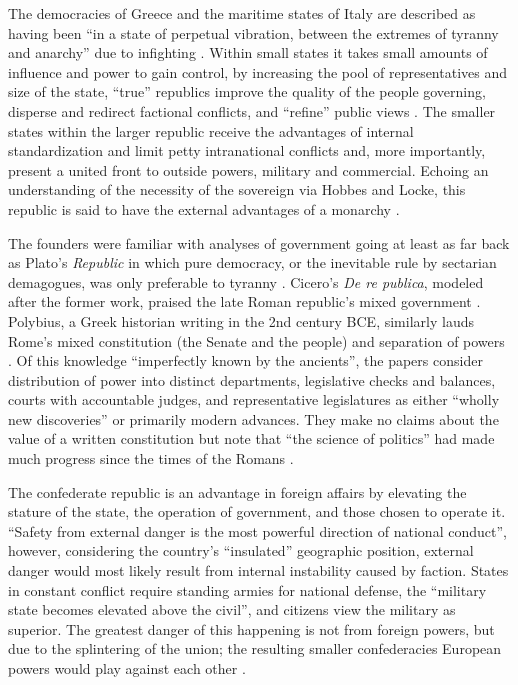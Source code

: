 The democracies of Greece and the maritime states of Italy are described as having been ``in a state of perpetual vibration, between the extremes of tyranny and anarchy'' due to infighting \cite[n. 9]{fed}.
Within small states it takes small amounts of influence and power to gain control, by increasing the pool of representatives and size of the state, ``true'' republics improve the quality of the people governing, disperse and redirect factional conflicts, and ``refine'' public views \cite[n. 2, 10]{fed}.
The smaller states within the larger republic receive the advantages of internal standardization and limit petty intranational conflicts and, more importantly, present a united front to outside powers, military and commercial.
Echoing an understanding of the necessity of the sovereign via Hobbes and Locke, this republic is said to have the external advantages of a monarchy \cite[n. 9]{fed}.

The founders were familiar with analyses of government going at least as far back as Plato's \emph{Republic} in which pure democracy, or the inevitable rule by sectarian demagogues, was only preferable to tyranny \cite{plato}.
Cicero's \emph{De re publica}, modeled after the former work, praised the late Roman republic's mixed government \cite{cicero}.
Polybius, a Greek historian writing in the 2nd century BCE, similarly lauds Rome's mixed constitution (the Senate and the people) and separation of powers \cite{polybius}.
Of this knowledge ``imperfectly known by the ancients'', the papers consider distribution of power into distinct departments, legislative checks and balances, courts with accountable judges, and representative legislatures as either ``wholly new discoveries'' or primarily modern advances.
They make no claims about the value of a written constitution but note that ``the science of politics'' had made much progress since the times of the Romans \cite[n. 9]{fed}.

The confederate republic is an advantage in foreign affairs by elevating the stature of the state, the operation of government, and those chosen to operate it.
``Safety from external danger is the most powerful direction of national conduct'', however, considering the country's ``insulated'' geographic position, external danger would most likely result from internal instability caused by faction.
States in constant conflict require standing armies for national defense, the ``military state becomes elevated above the civil'', and citizens view the military as superior.
The greatest danger of this happening is not from foreign powers, but due to the splintering of the union; the resulting smaller confederacies European powers would play against each other \cite[n. 8]{fed}.

